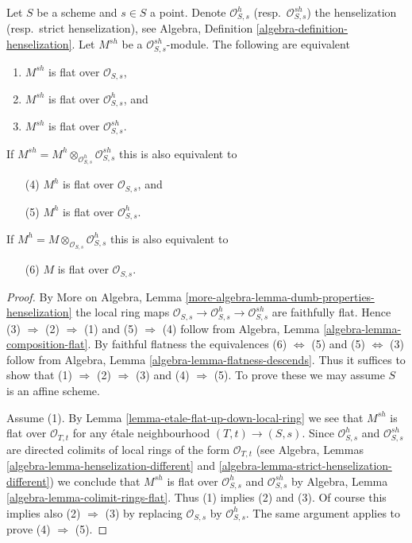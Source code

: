 \begin{lemma}
\label{lemma-flat-up-down-henselization}
Let $S$ be a scheme and $s \in S$ a point. Denote $\mathcal{O}_{S, s}^h$
(resp.\ $\mathcal{O}_{S, s}^{sh}$) the henselization (resp.\ strict
henselization), see
Algebra, Definition \ref{algebra-definition-henselization}.
Let $M^{sh}$ be a $\mathcal{O}_{S, s}^{sh}$-module.
The following are equivalent
\begin{enumerate}
\item $M^{sh}$ is flat over $\mathcal{O}_{S, s}$,
\item $M^{sh}$ is flat over $\mathcal{O}_{S, s}^h$, and
\item $M^{sh}$ is flat over $\mathcal{O}_{S, s}^{sh}$.
\end{enumerate}
If $M^{sh} = M^h \otimes_{\mathcal{O}_{S, s}^h} \mathcal{O}_{S, s}^{sh}$
this is also equivalent to
\begin{enumerate}
\item[(4)] $M^h$ is flat over $\mathcal{O}_{S, s}$, and
\item[(5)] $M^h$ is flat over $\mathcal{O}_{S, s}^h$.
\end{enumerate}
If $M^h = M \otimes_{\mathcal{O}_{S, s}} \mathcal{O}_{S, s}^h$
this is also equivalent to
\begin{enumerate}
\item[(6)] $M$ is flat over $\mathcal{O}_{S, s}$.
\end{enumerate}
\end{lemma}

\begin{proof}
By More on Algebra, Lemma
\ref{more-algebra-lemma-dumb-properties-henselization}
the local ring maps
$\mathcal{O}_{S, s} \to \mathcal{O}_{S, s}^h \to \mathcal{O}_{S, s}^{sh}$
are faithfully flat.
Hence (3) $\Rightarrow$ (2) $\Rightarrow$ (1) and
(5) $\Rightarrow$ (4) follow from
Algebra, Lemma \ref{algebra-lemma-composition-flat}.
By faithful flatness the equivalences (6) $\Leftrightarrow$ (5) and
(5) $\Leftrightarrow$ (3) follow from
Algebra, Lemma \ref{algebra-lemma-flatness-descends}.
Thus it suffices to show that
(1) $\Rightarrow$ (2) $\Rightarrow$ (3) and
(4) $\Rightarrow$ (5).
To prove these we may assume $S$ is an affine scheme.

\medskip\noindent
Assume (1). By
Lemma \ref{lemma-etale-flat-up-down-local-ring}
we see that $M^{sh}$ is flat over $\mathcal{O}_{T, t}$ for
any \'etale neighbourhood $(T, t) \to (S, s)$. Since $\mathcal{O}_{S, s}^h$
and $\mathcal{O}_{S, s}^{sh}$ are directed colimits of local rings
of the form $\mathcal{O}_{T, t}$ (see
Algebra, Lemmas \ref{algebra-lemma-henselization-different}
and \ref{algebra-lemma-strict-henselization-different})
we conclude that $M^{sh}$ is flat over $\mathcal{O}_{S, s}^h$
and $\mathcal{O}_{S, s}^{sh}$ by
Algebra, Lemma \ref{algebra-lemma-colimit-rings-flat}.
Thus (1) implies (2) and (3). Of course this implies also
(2) $\Rightarrow$ (3) by replacing $\mathcal{O}_{S, s}$ by
$\mathcal{O}_{S, s}^h$. The same argument applies to prove
(4) $\Rightarrow$ (5).
\end{proof}

